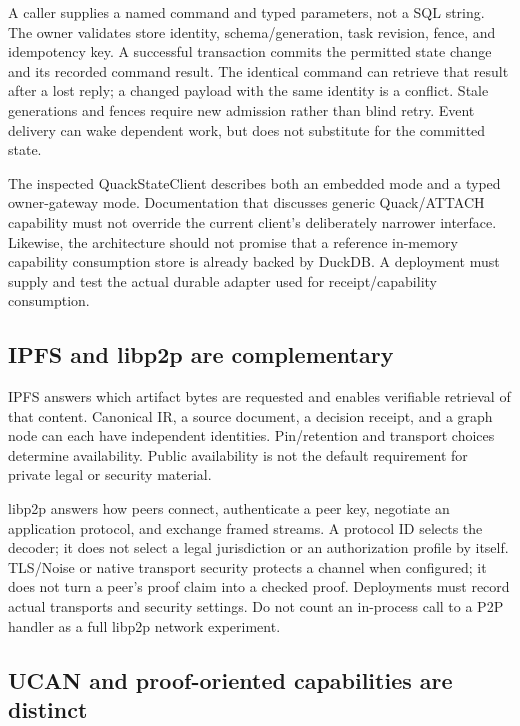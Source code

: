 \documentclass{article}
\begin{document}
A caller supplies a named command and typed parameters, not a SQL string. The owner validates store identity, schema/generation, task revision, fence, and idempotency key. A successful transaction commits the permitted state change and its recorded command result. The identical command can retrieve that result after a lost reply; a changed payload with the same identity is a conflict. Stale generations and fences require new admission rather than blind retry. Event delivery can wake dependent work, but does not substitute for the committed state.

The inspected QuackStateClient describes both an embedded mode and a typed owner-gateway mode. Documentation that discusses generic Quack/ATTACH capability must not override the current client's deliberately narrower interface. Likewise, the architecture should not promise that a reference in-memory capability consumption store is already backed by DuckDB. A deployment must supply and test the actual durable adapter used for receipt/capability consumption.

\subsection{IPFS and libp2p are complementary}

IPFS answers which artifact bytes are requested and enables verifiable retrieval of that content. Canonical IR, a source document, a decision receipt, and a graph node can each have independent identities. Pin/retention and transport choices determine availability. Public availability is not the default requirement for private legal or security material.

libp2p answers how peers connect, authenticate a peer key, negotiate an application protocol, and exchange framed streams. A protocol ID selects the decoder; it does not select a legal jurisdiction or an authorization profile by itself. TLS/Noise or native transport security protects a channel when configured; it does not turn a peer's proof claim into a checked proof. Deployments must record actual transports and security settings. Do not count an in-process call to a P2P handler as a full libp2p network experiment.

\subsection{UCAN and proof-oriented capabilities are distinct}
\end{document}
